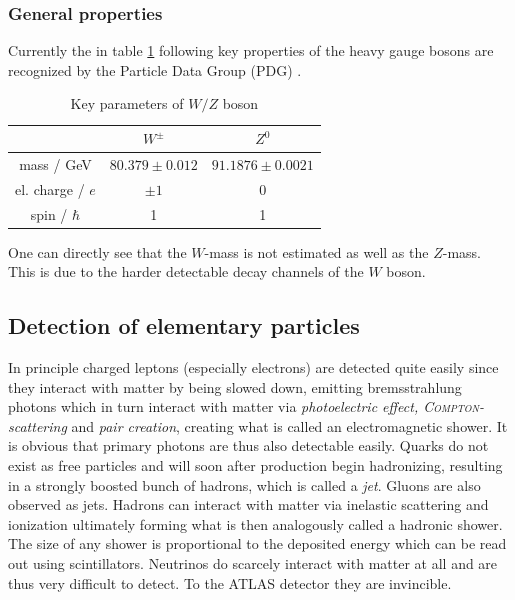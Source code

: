 \documentclass[11pt,a4paper,notitlepage]{scrartcl}
\begin{document}
\subsubsection{General properties}
Currently the in table \ref{tab:key} following key properties of the heavy gauge bosons are recognized by the Particle Data Group (PDG) \cite{pdg}.
\begin{table}[htbp]
	\centering
\begin{tabular}{c|cc}

	& $W^\pm$ & $Z^0$  \\
	\hline
	mass / GeV &  $80.379 \pm 0.012$   & $91.1876\pm 0.0021$  \\
	
	el. charge / $e$ & $\pm 1$  & 0 \\
	
	spin / $\hbar$& 1 & 1 \\
	
\end{tabular}
\caption{Key parameters of $W/Z$ boson}
\label{tab:key}
\end{table}
One can directly see that the $W$-mass is not estimated as well as the $Z$-mass. This is due to the harder detectable decay channels of the $W$ boson. 

\subsection{Detection of elementary particles}
In principle charged leptons (especially electrons) are detected quite easily since they interact with matter by being slowed down, emitting bremsstrahlung photons which in turn interact with matter via \emph{photoelectric effect, \textsc{Compton}-scattering} and \emph{pair creation}, creating what is called an electromagnetic shower. It is obvious that primary photons are thus also detectable easily. Quarks do not exist as free particles and will soon after production begin hadronizing, resulting in a strongly boosted bunch of hadrons, which is called a \emph{jet}. Gluons are also observed as jets. Hadrons can interact with matter via inelastic scattering and ionization ultimately forming what is then analogously called a hadronic shower. The size of any shower is proportional to the deposited energy which can be read out using scintillators. Neutrinos do scarcely interact with matter at all and are thus very difficult to detect. To the ATLAS detector they are invincible. \cite{manual}
\end{document}
